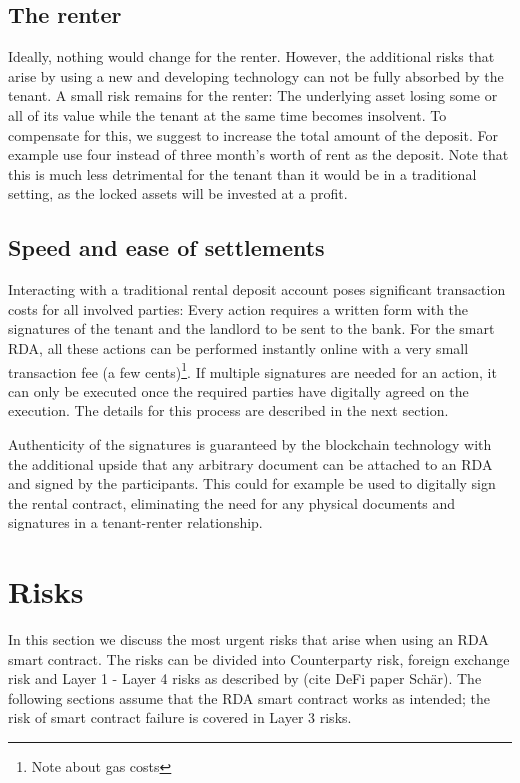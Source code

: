\documentclass[12pt,a4paper,titlepage,oneside,english]{article}
\begin{document}
\subsection{The renter}
Ideally, nothing would change for the renter. However, the additional risks that arise by using a new and developing technology can not be fully absorbed by the tenant. A small risk remains for the renter: The underlying asset losing some or all of its value while the tenant at the same time becomes insolvent. 
To compensate for this, we suggest to increase the total amount of the deposit. For example use four instead of three month's worth of rent as the deposit. Note that this is much less detrimental for the tenant than it would be in a traditional setting, as the locked assets will be invested at a profit.

\subsection{Speed and ease of settlements}
Interacting with a traditional rental deposit account poses significant transaction costs for all involved parties: Every action requires a written form with the signatures of the tenant and the landlord to be sent to the bank. For the smart RDA, all these actions can be performed instantly online with a very small transaction fee (a few cents)\footnote{Note about gas costs}. If multiple signatures are needed for an action, it can only be executed once the required parties have digitally agreed on the execution. The details for this process are described in the next section. 

Authenticity of the signatures is guaranteed by the blockchain technology with the additional upside that any arbitrary document can be attached to an RDA and signed by the participants. This could for example be used to digitally sign the rental contract, eliminating the need for any physical documents and signatures in a tenant-renter relationship.



\section{Risks}
In this section we discuss the most urgent risks that arise when using an RDA smart contract. The risks can be divided into Counterparty risk, foreign exchange risk and Layer 1 - Layer 4 risks as described by (cite DeFi paper Schär). The following sections assume that the RDA smart contract works as intended; the risk of smart contract failure is covered in Layer 3 risks.
\end{document}
